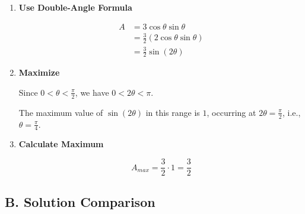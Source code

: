 \documentclass[12pt]{article}
\begin{document}
\begin{solutionbox}
\begin{enumerate}[leftmargin=*]
    \item \textbf{Use Double-Angle Formula}
    
    \begin{align*}
        A &= 3\cos\theta \sin\theta \\
        &= \frac{3}{2}(2\cos\theta \sin\theta) \\
        &= \frac{3}{2}\sin(2\theta)
    \end{align*}
    
    \item \textbf{Maximize}
    
    Since $0 < \theta < \frac{\pi}{2}$, we have $0 < 2\theta < \pi$.
    
    The maximum value of $\sin(2\theta)$ in this range is $1$, occurring at $2\theta = \frac{\pi}{2}$, i.e., $\theta = \frac{\pi}{4}$.
    
    \item \textbf{Calculate Maximum}
    
    \begin{equation}
        A_{max} = \frac{3}{2} \cdot 1 = \frac{3}{2}
    \end{equation}
\end{enumerate}

\subsection*{B. Solution Comparison}


\end{solutionbox}
\end{document}
